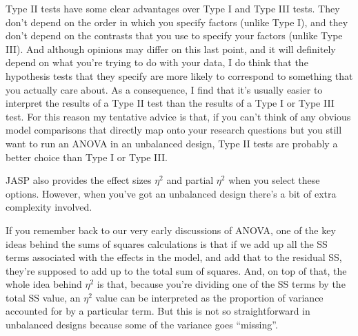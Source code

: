 Type II tests have some clear advantages over Type I and Type III tests. They don't depend on the order in which you specify factors (unlike Type I), and they don't depend on the contrasts that you use to specify your factors (unlike Type III). And although opinions may differ on this last point, and it will definitely depend on what you're trying to do with your data, I do think that the hypothesis tests that they specify are more likely to correspond to something that you actually care about. As a consequence, I find that it's usually easier to interpret the results of a Type II test than the results of a Type I or Type III test. For this reason my tentative advice is that, if you can't think of any obvious model comparisons that directly map onto your research questions but you still want to run an ANOVA in an unbalanced design, Type II tests are probably a better choice than Type I or Type III.


JASP also provides the effect sizes $\eta^2$ and partial $\eta^2$ when you select these options. However, when you've got an unbalanced design there's a bit of extra complexity involved. 

If you remember back to our very early discussions of ANOVA, one of the key ideas behind the sums of squares calculations is that if we add up all the SS terms associated with the effects in the model, and add that to the residual SS, they're supposed to add up to the total sum of squares. And, on top of that, the whole idea behind $\eta^2$ is that, because you're dividing one of the SS terms by the total SS value, an $\eta^2$ value can be interpreted as the proportion of variance accounted for by a particular term. But this is not so straightforward in unbalanced designs because some of the variance goes ``missing''.

